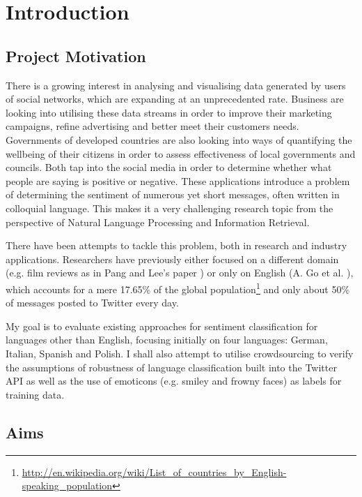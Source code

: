 \chapter{Introduction}

\section{Project Motivation}


There is a growing interest in analysing and visualising data generated by users of social networks, which are expanding at an unprecedented rate. Business are looking into utilising these data streams in order to improve their marketing campaigns, refine advertising and better meet their customers needs. Governments of developed countries are also looking into ways of quantifying the wellbeing of their citizens in order to assess effectiveness of local governments and councils. Both tap into the social media in order to determine whether what people are saying is positive or negative. These applications introduce a problem of determining the sentiment of numerous yet short messages, often written in colloquial language. This makes it a very challenging research topic from the perspective of Natural Language Processing and Information Retrieval.


There have been attempts to tackle this problem, both in research and industry applications. Researchers have previously either focused on a different domain (e.g. film reviews as in Pang and Lee's paper \cite{PangAndLee}) or only on English (A. Go et al. \cite{TwitterDistantSupervision09}), which accounts for a mere 17.65\% of the global population\footnote{\url{http://en.wikipedia.org/wiki/List_of_countries_by_English-speaking_population}} and only about 50\% of messages posted to Twitter every day.


My goal is to evaluate existing approaches for sentiment classification for languages other than English, focusing initially on four languages: German, Italian, Spanish and Polish. I shall also attempt to utilise crowdsourcing to verify the assumptions of robustness of language classification built into the Twitter API as well as the use of emoticons (e.g. smiley and frowny faces) as labels for training data.

\section{Aims}

